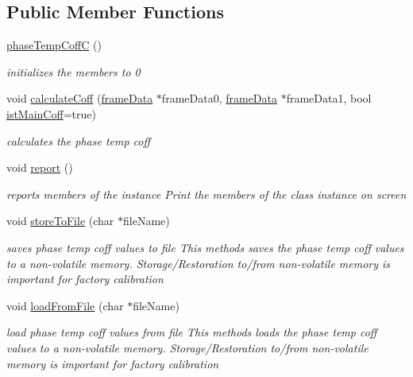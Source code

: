 \subsection*{Public Member Functions}
\begin{DoxyCompactItemize}
\item 
\mbox{\hyperlink{class_o_p_t3101_1_1phase_temp_coff_c_a537d187395d87831e0004e333b1e0e94}{phase\+Temp\+CoffC}} ()
\begin{DoxyCompactList}\small\item\em initializes the members to 0 \end{DoxyCompactList}\item 
void \mbox{\hyperlink{class_o_p_t3101_1_1phase_temp_coff_c_a6a9ce25c87c81782b999e28c0a63a6af}{calculate\+Coff}} (\mbox{\hyperlink{class_o_p_t3101_1_1frame_data}{frame\+Data}} $\ast$frame\+Data0, \mbox{\hyperlink{class_o_p_t3101_1_1frame_data}{frame\+Data}} $\ast$frame\+Data1, bool \mbox{\hyperlink{class_o_p_t3101_1_1phase_temp_coff_c_abcd691cfc4678e3588bc1b38600632e7}{ist\+Main\+Coff}}=true)
\begin{DoxyCompactList}\small\item\em calculates the phase temp coff \end{DoxyCompactList}\item 
void \mbox{\hyperlink{class_o_p_t3101_1_1phase_temp_coff_c_af41bc218f81c9bfe8ae00e0bc6a64f4f}{report}} ()
\begin{DoxyCompactList}\small\item\em reports members of the instance Print the members of the class instance on screen \end{DoxyCompactList}\item 
void \mbox{\hyperlink{class_o_p_t3101_1_1phase_temp_coff_c_a05f0376e59830c4c81b37dc2042237e6}{store\+To\+File}} (char $\ast$file\+Name)
\begin{DoxyCompactList}\small\item\em saves phase temp coff values to file This methods saves the phase temp coff values to a non-\/volatile memory. Storage/\+Restoration to/from non-\/volatile memory is important for factory calibration \end{DoxyCompactList}\item 
void \mbox{\hyperlink{class_o_p_t3101_1_1phase_temp_coff_c_a26e1e98384b8d69f1f8bb8f3cd88071f}{load\+From\+File}} (char $\ast$file\+Name)
\begin{DoxyCompactList}\small\item\em load phase temp coff values from file This methods loads the phase temp coff values to a non-\/volatile memory. Storage/\+Restoration to/from non-\/volatile memory is important for factory calibration \end{DoxyCompactList}\end{DoxyCompactItemize}
